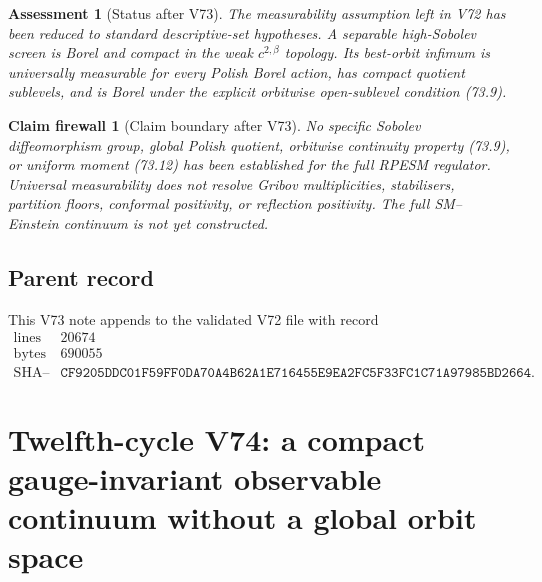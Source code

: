 \documentclass[11pt]{article}
\newtheorem{firewall}[theorem]{Claim firewall}
\newtheorem{assessment}[theorem]{Assessment}
\theoremstyle{remark}
\begin{document}
\begin{assessment}[Status after V73]
\label{ass:v12v73-status}
The measurability assumption left in V72 has been reduced to standard
descriptive-set hypotheses.  A separable high-Sobolev screen is
Borel and compact in the weak \(c^{2,\beta}\) topology.  Its
best-orbit infimum is universally measurable for every Polish Borel
action, has compact quotient sublevels, and is Borel under the
explicit orbitwise open-sublevel condition (73.9).
\end{assessment}

\begin{firewall}[Claim boundary after V73]
\label{fire:v12v73-claim}
No specific Sobolev diffeomorphism group, global Polish quotient,
orbitwise continuity property (73.9), or uniform moment (73.12) has
been established for the full RPESM regulator.  Universal
measurability does not resolve Gribov multiplicities, stabilisers,
partition floors, conformal positivity, or reflection positivity.
The full SM--Einstein continuum is not yet constructed.
\end{firewall}

\subsection{Parent record}

This V73 note appends to the validated V72 file with record
\[
\begin{array}{c|c}
\text{lines}&20674\\
\text{bytes}&690055\\
\text{SHA--256}&
\texttt{CF9205DDC01F59FF0DA70A4B62A1E716455E9EA2FC5F33FC1C71A97985BD2664}.
\end{array}
\]





\section{Twelfth-cycle V74: a compact gauge-invariant observable
continuum without a global orbit space}
\label{sec:v12v74}
\end{document}
